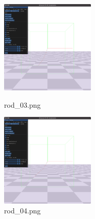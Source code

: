 \documentclass[a4paper,10pt,uplatex,dvipdfmx]{jsarticle}
\begin{document}
\begin{figure}[htbp]
  \begin{minipage}{0.33\hsize}
    \begin{center}
      \includegraphics[width=45mm]{img/rod_03.png}
      \caption{rod\_03.png}
    \end{center}
  \end{minipage}
  \begin{minipage}{0.33\hsize}
    \begin{center}
      \includegraphics[width=45mm]{img/rod_04.png}
      \caption{rod\_04.png}
    \end{center}
  \end{minipage}
\end{figure}
\end{document}
